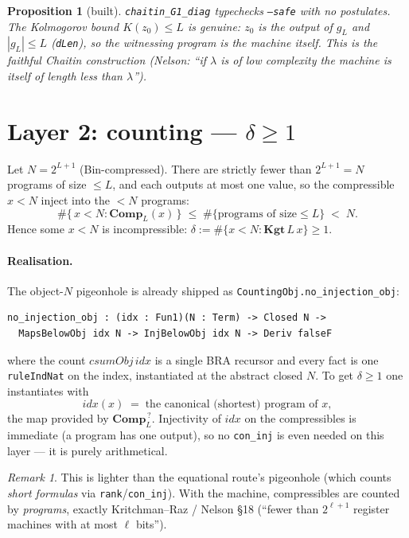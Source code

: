 \documentclass[11pt]{article}
\theoremstyle{plain}
\newtheorem{proposition}[theorem]{Proposition}
\theoremstyle{definition}
\theoremstyle{remark}
\newtheorem{remark}[theorem]{Remark}
\newcommand{\Kgt}{\mathbf{Kgt}}
\newcommand{\Comp}{\mathbf{Comp}}
\begin{document}
\begin{proposition}[built]
\texttt{chaitin\_G1\_diag} typechecks \texttt{--safe} with no postulates. The
Kolmogorov bound $K(z_0) \le L$ is genuine: $z_0$ is the output of $g_L$ and
$|g_L| \le L$ (\texttt{dLen}), so the witnessing program is the machine itself.
This is the faithful Chaitin construction (Nelson: ``if $\lambda$ is of low
complexity the machine is itself of length less than $\lambda$'').
\end{proposition}

\section{Layer 2: counting --- $\delta \ge 1$}

Let $N = 2^{L+1}$ (Bin-compressed). There are strictly fewer than $2^{L+1}=N$
programs of size $\le L$, and each outputs at most one value, so the compressible
$x<N$ inject into the $<N$ programs:
\[
  \#\{\,x<N : \Comp_L(x)\,\} \;\le\; \#\{\text{programs of size}\le L\} \;<\; N.
\]
Hence some $x<N$ is incompressible: $\delta := \#\{x<N : \Kgt\,L\,x\} \ge 1$.

\paragraph{Realisation.} The object-$N$ pigeonhole is already shipped as
\texttt{CountingObj.no\_injection\_obj}:
\begin{lstlisting}
no_injection_obj : (idx : Fun1)(N : Term) -> Closed N ->
  MapsBelowObj idx N -> InjBelowObj idx N -> Deriv falseF
\end{lstlisting}
where the count $\mathit{csumObj}\,\mathit{idx}$ is a single BRA recursor and every
fact is one \texttt{ruleIndNat} on the index, instantiated at the abstract closed
$N$. To get $\delta \ge 1$ one instantiates with
\[
  \mathit{idx}(x) \;=\; \text{the canonical (shortest) program of $x$},
\]
the map provided by $\Comp_L^{\,?}$. Injectivity of $\mathit{idx}$ on the
compressibles is immediate (a program has one output), so no \texttt{con\_inj} is
even needed on this layer --- it is purely arithmetical.

\begin{remark}
This is lighter than the equational route's pigeonhole (which counts \emph{short
formulas} via \texttt{rank}/\texttt{con\_inj}). With the machine, compressibles
are counted by \emph{programs}, exactly Kritchman--Raz / Nelson \S18 (``fewer than
$2^{\ell+1}$ register machines with at most $\ell$ bits'').
\end{remark}
\end{document}
